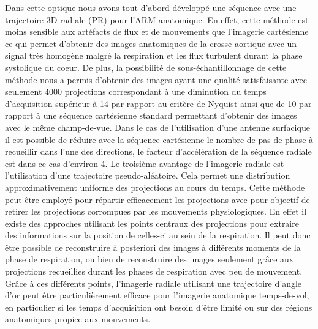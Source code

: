 Dans cette optique nous avons tout d'abord développé une séquence avec une trajectoire 3D radiale (PR) pour l'ARM anatomique. En effet, cette méthode est moins sensible aux artéfacts de flux et de mouvements que l'imagerie cartésienne ce qui permet d'obtenir des images anatomiques de la crosse aortique avec un signal très homogène malgré la respiration et les flux turbulent durant la phase systolique du coeur. 
De plus, la possibilité de sous-échantillonnage de cette méthode nous a permis d'obtenir des images ayant une qualité satisfaisante avec seulement 4000 projections correspondant à une diminution du temps d'acquisition supérieur à 14 par rapport au critère de Nyquist ainsi que de 10 par rapport à une séquence cartésienne standard permettant d'obtenir des images avec le même champ-de-vue. Dans le cas de l'utilisation d'une antenne surfacique il est possible de réduire avec la séquence cartésienne le nombre de pas de phase à recueillir dans l'une des directions, le facteur d'accélération de la séquence radiale est dans ce cas d'environ 4.
Le troisième avantage de l'imagerie radiale est l'utilisation d'une trajectoire pseudo-aléatoire. Cela permet une distribution approximativement uniforme des projections au cours du temps. Cette méthode peut être employé pour répartir efficacement les projections avec pour objectif de retirer les projections corrompues par les mouvements physiologiques. En effet il existe des approches utilisant les points centraux des projections pour extraire des informations sur la position de celles-ci au sein de la respiration. Il peut donc être possible de reconstruire à posteriori des images à différents moments de la phase de respiration, ou bien de reconstruire des images seulement grâce aux projections recueillies durant les phases de respiration avec peu de mouvement.
Grâce à ces différents points, l'imagerie radiale utilisant une trajectoire d'angle d'or peut être particulièrement efficace pour l'imagerie anatomique temps-de-vol, en particulier si les temps d'acquisition ont besoin d'être limité ou sur des régions anatomiques propice aux mouvements. 

